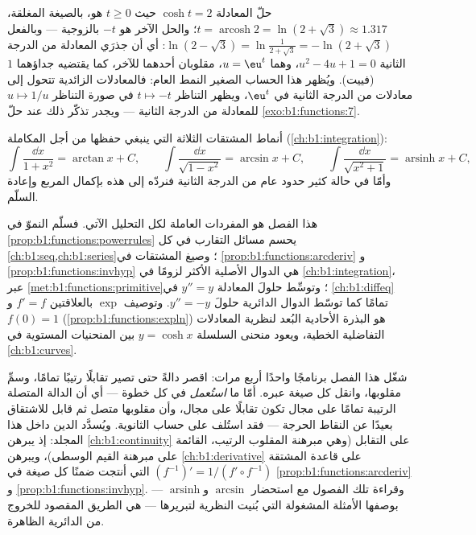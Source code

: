 \begin{example}\label{ex:b1:functions:arcoshtwo}
حلّ المعادلة $\cosh t = 2$ حيث $t \geq 0$ هو، بالصيغة
المغلقة، $t = \operatorname{arcosh} 2 = \ln(2 + \sqrt3) \approx
1.317$؛ والحل الآخر هو $-t$ بالزوجية --- وبالفعل
$\ln(2 - \sqrt3) = \ln\frac1{2 + \sqrt3} = -\ln(2 + \sqrt3)$: أي أن
جذرَي المعادلة من الدرجة الثانية $u^2 - 4u + 1 = 0$، وهما $u = \eu^t$،
مقلوبان أحدهما للآخر، كما يقتضيه جداؤهما $1$ (فييت). ويُظهر هذا
الحساب الصغير النمط العام: فالمعادلات الزائدية
تتحول إلى معادلات من الدرجة الثانية في $\eu^t$، ويظهر التناظر $t \mapsto -t$
في صورة التناظر $u \mapsto 1/u$ للمعادلة من الدرجة الثانية ---
ويجدر تذكّر ذلك عند حلّ \cref{exo:b1:functions:7}.
\end{example}

\begin{method}\label{met:b1:functions:primitive}
أنماط المشتقات الثلاثة التي ينبغي حفظها من أجل المكاملة
(\cref{ch:b1:integration}):
\[
\int \frac{\dd x}{1 + x^2} = \arctan x + C,
\qquad
\int \frac{\dd x}{\sqrt{1 - x^2}} = \arcsin x + C,
\qquad
\int \frac{\dd x}{\sqrt{x^2 + 1}} = \operatorname{arsinh} x + C,
\]
وأمّا في حالة كثير حدود عام من الدرجة الثانية فنردّه إلى هذه
بإكمال المربع وإعادة السلّم.
\end{method}

\begin{remark}\label{rem:b1:functions:whereused}
هذا الفصل هو المفردات العاملة لكل التحليل الآتي.
فسلّم النموّ في \cref{prop:b1:functions:powerrules} يحسم
مسائل التقارب في كل \cref{ch:b1:seq,ch:b1:series}؛
وصيغ المشتقات في \cref{prop:b1:functions:arcderiv} و
\cref{prop:b1:functions:invhyp} هي الدوال الأصلية الأكثر
لزومًا في \cref{ch:b1:integration}، عبر
\cref{met:b1:functions:primitive}؛ وتوسِّط 
حلولَ المعادلة $y'' = y$ في
\cref{ch:b1:diffeq} تمامًا كما توسّط الدوال الدائرية
حلولَ $y'' = -y$. وتوصيف $\exp$ بالعلاقتين $f' = f$ و
$f(0) = 1$ (\cref{prop:b1:functions:expln}) هو البذرة الأحادية
البُعد لنظرية المعادلات التفاضلية الخطية، ويعود
منحنى السلسلة $y = \cosh x$ بين المنحنيات المستوية في
\cref{ch:b1:curves}.
\end{remark}

\begin{remark}\label{rem:b1:functions:interlude}
شغّل هذا الفصل برنامجًا واحدًا أربع مرات: اقصر دالةً
حتى تصير تقابلًا رتيبًا تمامًا، وسمِّ مقلوبها،
وانقل كل صيغة عبره. أمّا ما \emph{استُعمل} في كل
خطوة --- أي أن الدالة المتصلة الرتيبة تمامًا على
مجال تكون تقابلًا على مجال، وأن مقلوبها
متصل ثم قابل للاشتقاق بعيدًا عن النقاط الحرجة --- فقد
استُلف على حساب الثانوية. ويُسدَّد الدين داخل هذا
المجلد: إذ يبرهن \cref{ch:b1:continuity} على  التقابل
(وهي مبرهنة المقلوب الرتيب، القائمة على مبرهنة القيم
الوسطى)، ويبرهن \cref{ch:b1:derivative} على قاعدة المشتقة
$(f^{-1})' = 1/(f' \circ f^{-1})$ التي أنتجت ضمنًا كل
صيغة في \cref{prop:b1:functions:arcderiv} و
\cref{prop:b1:functions:invhyp}. وقراءة تلك الفصول مع استحضار
$\arcsin$ و$\operatorname{arsinh}$ --- بوصفها الأمثلة المشغولة
التي بُنيت النظرية لتبريرها --- هي الطريق المقصود
للخروج من الدائرية الظاهرة.
\end{remark}

